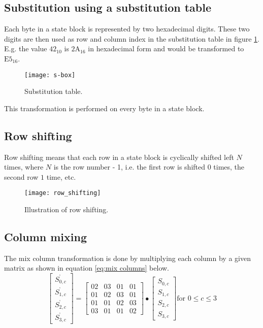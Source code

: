 \documentclass[report.tex]{subfiles}
\begin{document}
\clearpage

\subsection{Substitution using a substitution table}\label{sec:substitution}
Each byte in a state block is represented by two hexadecimal digits. These two digits are then used as row and column index in the substitution table in figure \ref{fig:s-box}. E.g. the value $\textrm{42}_{10}$ is $\textrm{2A}_{16}$ in hexadecimal form and would be transformed to $\textrm{E5}_{16}$.

\begin{figure}[ht]
\centering
\texttt{[image: s-box]}
\caption{Substitution table.\cite{fips}}
\label{fig:s-box}
\end{figure}

This transformation is performed on every byte in a state block.

\subsection{Row shifting}
Row shifting means that each row in a state block is cyclically shifted left $N$ times, where $N$ is the row number - 1, i.e. the first row is shifted $0$ times, the second row $1$ time, etc.

\begin{figure}[ht]
\centering
\texttt{[image: row\_shifting]}
\caption{Illustration of row shifting.\cite{fips}}
\label{fig:row_shifting}
\end{figure}

\subsection{Column mixing}
The mix column transformation is done by multiplying each column by a given matrix as shown in equation \ref{eq:mix columns} below.
\begin{equation}
\label{eq:mix columns}
	\begin{bmatrix}
	S_{0,c}^\text{'} \\
	S_{1,c}^\text{'} \\
	S_{2,c}^\text{'} \\
	S_{3,c}^\text{'}
	\end{bmatrix}
	=
	\begin{bmatrix}
	02 & 03 & 01 & 01 \\
	01 & 02 & 03 & 01 \\
	01 & 01 & 02 & 03 \\
	03 & 01 & 01 & 02
	\end{bmatrix}
	\bullet
	\begin{bmatrix}
	S_{0,c} \\
	S_{1,c} \\
	S_{2,c} \\
	S_{3,c}
	\end{bmatrix}
	\text{for }0 \leq c \leq 3
\end{equation}
\end{document}
